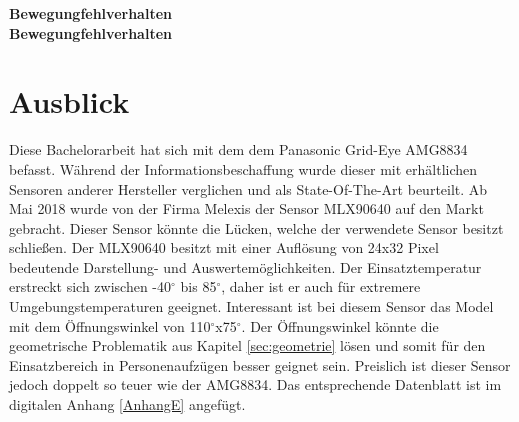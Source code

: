 \textbf{Bewegungfehlverhalten}\\

\textbf{Bewegungfehlverhalten}\\

\section{Ausblick}

Diese Bachelorarbeit hat sich mit dem dem Panasonic Grid-Eye AMG8834 befasst. Während der Informationsbeschaffung wurde dieser mit erhältlichen Sensoren anderer Hersteller verglichen und als State-Of-The-Art beurteilt.  
Ab Mai 2018 wurde von der Firma Melexis der Sensor MLX90640 auf den Markt gebracht. Dieser Sensor könnte die Lücken, welche der verwendete Sensor besitzt schließen. Der MLX90640 besitzt mit einer Auflösung von 24x32 Pixel bedeutende Darstellung- und Auswertemöglichkeiten. Der Einsatztemperatur erstreckt sich zwischen -40$^\circ$ bis 85$^\circ$, daher ist er auch für extremere Umgebungstemperaturen geeignet. Interessant ist bei diesem Sensor das Model mit dem Öffnungswinkel von 110$^\circ$x75$^\circ$. Der Öffnungswinkel könnte die geometrische Problematik aus Kapitel \ref{sec:geometrie} lösen und somit für den Einsatzbereich in Personenaufzügen besser geignet sein. Preislich ist dieser Sensor jedoch doppelt so teuer wie der AMG8834. Das entsprechende Datenblatt ist im digitalen Anhang \ref{AnhangE} angefügt. 



